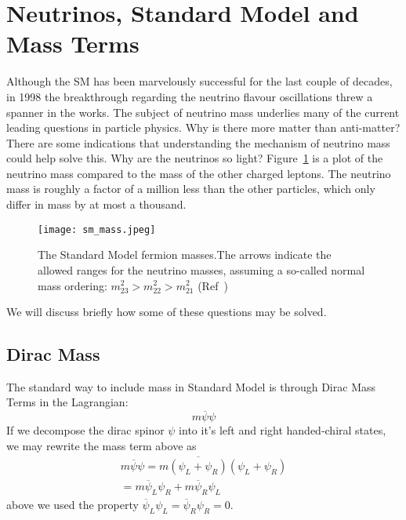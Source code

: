 \section{\label{sec:mass_in_sm}Neutrinos, Standard Model and Mass Terms}

Although the SM has been marvelously successful for the last couple of decades, in 1998 the breakthrough regarding the neutrino flavour oscillations threw a spanner in the works. The subject of neutrino mass underlies many of the current leading questions in particle physics. Why is there more matter than anti-matter? There are some indications that understanding the mechanism of neutrino mass could help solve this. Why are the neutrinos so light? Figure~\ref{fig:sm_fremion_mass} is a plot of the neutrino mass compared to the mass of the other charged leptons. The neutrino mass is roughly a factor of a million less than the other particles, which only differ in mass by at most a thousand.


\begin{figure}[!ht]
    \centering
    \texttt{[image: sm\_mass.jpeg]}
    \caption{The Standard Model fermion masses.The arrows indicate the allowed ranges for the neutrino masses, assuming a so-called normal mass ordering: $m_{23} ^2> m_{22}^2 > m_{21}^2$ (Ref~)}
    \label{fig:sm_fremion_mass}
\end{figure}
We will discuss briefly how some of these questions may be solved.  



\subsection{Dirac Mass}
The standard way to include mass in Standard Model is through Dirac Mass Terms in the Lagrangian:
\begin{equation}
        m\overline {\psi} \psi
\end{equation}
If we decompose the dirac spinor \(\psi\) into it's left and right handed-chiral states, we may rewrite the mass term above as
\begin{equation}
    \begin{aligned}
        m\overline {\psi} \psi = m\overline{(\psi_L + \psi _R)}(\psi_L + \psi _R)\\
         = m\overline {\psi} _L \psi_R + m\overline {\psi}_R \psi_L
    \end{aligned}
\end{equation}
above we used the property \(\overline {\psi}_L \psi_L =\overline {\psi}_R \psi_R = 0\).

